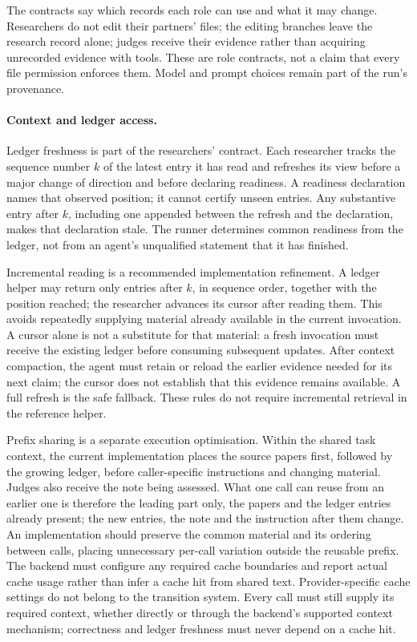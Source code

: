 \documentclass[11pt,a4paper]{article}
\begin{document}
The contracts say which records each role can use and what it may change.
Researchers do not edit their partners' files; the editing branches leave the
research record alone; judges receive their evidence rather than acquiring
unrecorded evidence with tools. These are role contracts, not a claim that every
file permission enforces them. Model and prompt choices remain part of the run's
provenance.

\paragraph{Context and ledger access.}
Ledger freshness is part of the researchers' contract. Each researcher tracks
the sequence number \(k\) of the latest entry it has read and refreshes its view
before a major change of direction and before declaring readiness. A readiness
declaration names that observed position; it cannot certify unseen entries. Any
substantive entry after \(k\), including one appended between the refresh and
the declaration, makes that declaration stale. The runner determines common
readiness from the ledger, not from an agent's unqualified statement that it has
finished.

Incremental reading is a recommended implementation refinement. A ledger helper
may return only entries after \(k\), in sequence order, together with the
position reached; the researcher advances its cursor after reading them. This
avoids repeatedly supplying material already available in the current
invocation. A cursor alone is not a substitute for that material: a fresh
invocation must receive the existing ledger before consuming subsequent updates.
After context compaction, the agent must retain or reload the earlier evidence
needed for its next claim; the cursor does not establish that this evidence
remains available. A full refresh is the safe fallback. These rules do not
require incremental retrieval in the reference helper.

Prefix sharing is a separate execution optimisation. Within the shared task
context, the current implementation places the source papers first, followed by
the growing ledger, before caller-specific instructions and changing material.
Judges also receive the note being assessed. What one call can reuse from an
earlier one is therefore the leading part only, the papers and the ledger
entries already present; the new entries, the note and the instruction after
them change. An implementation should preserve
the common material and its ordering between calls, placing unnecessary per-call
variation outside the reusable prefix. The backend must configure any required
cache boundaries and report actual cache usage rather than infer a cache hit
from shared text. Provider-specific cache settings do not belong to the
transition system. Every call must still supply its required context, whether
directly or through the backend's supported context mechanism; correctness and
ledger freshness must never depend on a cache hit.
\end{document}
